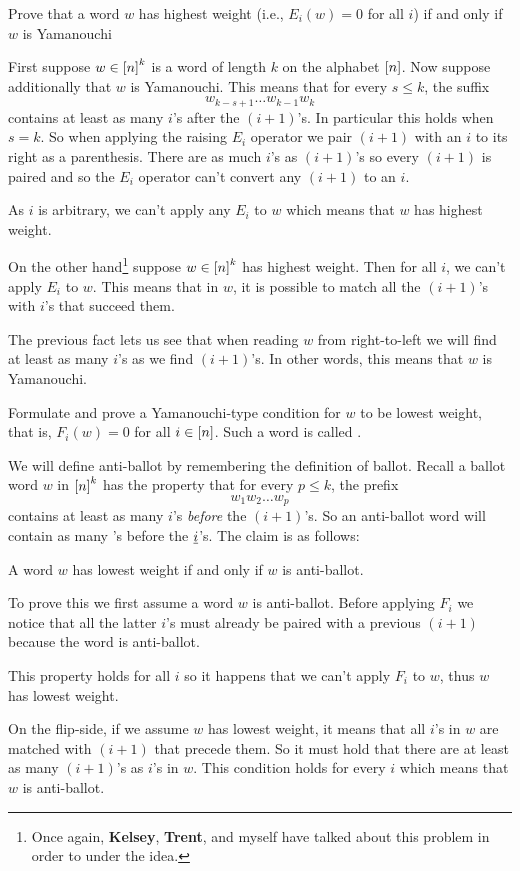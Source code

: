 \documentclass[12pt]{memoir}
\begin{document}
\begin{Ej}[Exercise 3]
    Prove that a word $w$ has highest weight (i.e., $E_i(w)=0$ for all $i$) if and only if $w$ is Yamanouchi
\end{Ej}
\begin{ptcbr}
    First suppose $w\in\left\lbrack n\right\rbrack^k$ is a word of length $k$ on the alphabet $\left\lbrack n\right\rbrack$. Now suppose additionally that $w$ is Yamanouchi. This means that for every $s\leq k$, the suffix 
    $$w_{k-s+1}\dots w_{k-1}w_k$$ 
    contains at least as many $i$'s after the $(i+1)$'s. In particular this holds when $s=k$. So when applying the raising $E_i$ operator we pair $(i+1)$ with an $i$ to its right as a parenthesis. There are as much $i$'s as $(i+1)$'s so every $(i+1)$ is paired and so the $E_i$ operator can't convert any $(i+1)$ to an $i$.\par 
    As $i$ is arbitrary, we can't apply any $E_i$ to $w$ which means that $w$ has highest weight.\par 
    On the other hand\footnote{Once again, \textbf{Kelsey}, \textbf{Trent}, and myself have talked about this problem in order to under the idea.} suppose $w\in\left\lbrack n\right\rbrack^k$ has highest weight. Then for all $i$, we can't apply $E_i$ to $w$. This means that in $w$, it is possible to match all the $(i+1)$'s with $i$'s that succeed them.\par 
    The previous fact lets us see that when reading $w$ from right-to-left we will find at least as many $i$'s as we find $(i+1)$'s. In other words, this means that $w$ is Yamanouchi.
    \end{ptcbr}


\begin{Ej}[Exercise 4]
    Formulate and prove a Yamanouchi-type condition for $w$ to be lowest weight, that is, $F_i(w) = 0$
for all $i\in\left\lbrack n\right\rbrack$. Such a word is called .
\end{Ej}
\begin{ptcbr}
We will define anti-ballot by remembering the definition of ballot. Recall a ballot word $w$ in $\left\lbrack n\right\rbrack^k$ has the property that for every $p\leq k$, the prefix 
$$w_1w_2\dots w_p$$
contains at least as many $i$'s \emph{before} the $(i+1)$'s. So an anti-ballot word will contain as many 's before the $\underline i$'s. The claim is as follows:
\begin{significant}
A word $w$ has lowest weight if and only if $w$ is anti-ballot.
\end{significant}
To prove this we first assume a word $w$ is anti-ballot. Before applying $F_i$ we notice that all the latter $i$'s must already be paired with a previous $(i+1)$ because the word is anti-ballot.\par 
This property holds for all $i$ so it happens that we can't apply $F_i$ to $w$, thus $w$ has lowest weight.\par
On the flip-side, if we assume $w$ has lowest weight, it means that all $i$'s in $w$ are matched with $(i+1)$ that precede them. So it must hold that there are at least as many $(i+1)$'s as $i$'s in $w$. This condition holds for every $i$ which means that $w$ is anti-ballot.
\end{ptcbr}
\end{document}
